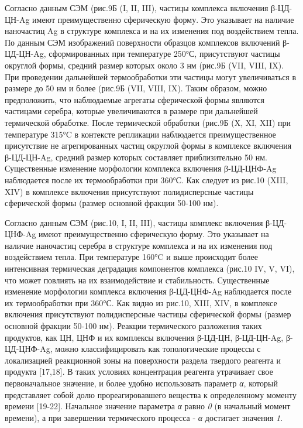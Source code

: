 Согласно данным СЭМ (рис.9Б (I, II, III), частицы комплекса включения
β-ЦД-ЦН-Ag имеют преимущественно сферическую форму. Это указывает на
наличие наночастиц Ag в структуре комплекса и на их изменения под
воздействием тепла. По данным СЭМ изображений поверхности образцов
комплексов включений β-ЦД-ЦН-Ag, сформированных при температуре 250°С,
присутствуют частицы округлой формы, средний размер которых около 3 нм
(рис.9Б (VII, VIII, IX). При проведении дальнейшей термообработки эти
частицы могут увеличиваться в размере до 50 нм и более (рис.9Б (VII,
VIII, IX). Таким образом, можно предположить, что наблюдаемые агрегаты
сферической формы являются частицами серебра, которые увеличиваются в
размере при дальнейшей термической обработке. После термической
обработки (рис.9Б (X, XI, XII) при температуре 315°C в контексте
репликации наблюдается преимущественное присутствие не агрегированных
частиц округлой формы в комплексе включения β-ЦД-ЦН-Ag, средний размер
которых составляет приблизительно 50 нм. Существенные изменение
морфологии комплекса включения β-ЦД-ЦНФ-Ag наблюдается после их
термообработки при 360°С. Как следует из рис.10 (XIII, XIV) в комплексе
включения присутствуют полидисперсные частицы сферической формы (размер
основной фракции 50-100 нм).

Согласно данным СЭМ (рис.10, I, II, III), частицы комплекс включения
β-ЦД-ЦНФ-Ag имеют преимущественно сферическую форму. Это указывает на
наличие наночастиц серебра в структуре комплекса и на их изменения под
воздействием тепла. При температуре 160°C и выше происходит более
интенсивная термическая деградация компонентов комплекса (рис.10 IV, V,
VI), что может повлиять на их взаимодействие и стабильность.
Существенные изменение морфологии комплекса включения β-ЦД-ЦНФ-Ag
наблюдается после их термообработки при 360°С. Как видно из рис.10,
XIII, XIV, в комплексе включения присутствуют полидисперсные частицы
сферической формы (размер основной фракции 50-100 нм). Реакции
термического разложения таких продуктов, как ЦН, ЦНФ и их комплексы
включения β-ЦД-ЦН, β-ЦД-ЦН-Ag, β-ЦД-ЦНФ-Ag, можно классифицировать как
топологические процессы с локализацией реакционной зоны на поверхности
раздела твердого реагента и продукта {[}17,18{]}. В таких условиях
концентрация реагента утрачивает свое первоначальное значение, и более
удобно использовать параметр \emph{α}, который представляет собой долю
прореагировавшего вещества к определенному моменту времени {[}19-22{]}.
Начальное значение параметра \emph{α} равно \emph{0} (в начальный момент
времени), а при завершении термического процесса - \emph{α} достигает
значения \emph{1}.

